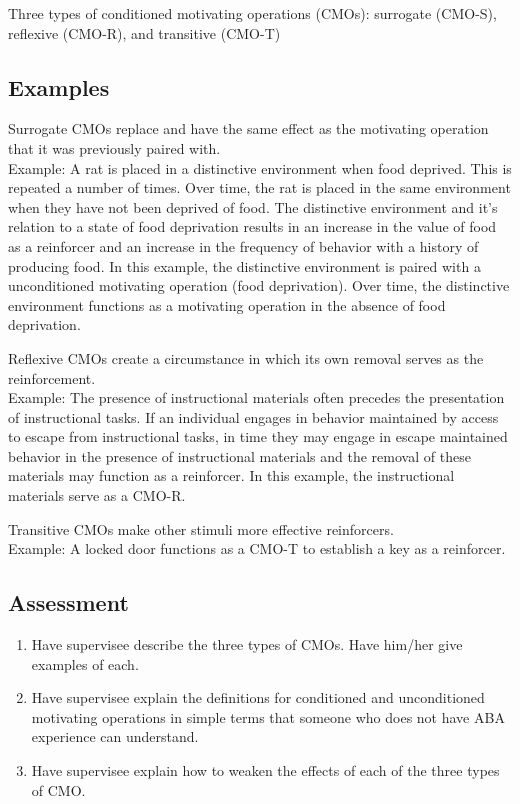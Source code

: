 Three types of conditioned motivating operations (CMOs): surrogate (CMO-S), reflexive (CMO-R), and transitive (CMO-T)\\



\subsection{Examples}
Surrogate CMOs replace and have the same effect as the motivating operation that it was previously paired with.\\

Example: A rat is placed in a distinctive environment when food deprived. This is repeated a number of times. Over time, the rat is placed in the same environment when they have not been deprived of food. The distinctive environment and it's relation to a state of food deprivation results in an increase in the value of food as a reinforcer and an increase in the frequency of behavior with a history of producing food. In this example, the distinctive environment is paired with a unconditioned motivating operation (food deprivation). Over time, the distinctive environment functions as a motivating operation in the absence of food deprivation. 

Reflexive CMOs create a circumstance in which its own removal serves as the reinforcement.\\

Example: The presence of instructional materials often precedes the presentation of instructional tasks. If an individual engages in behavior maintained by access to escape from instructional tasks, in time they may engage in escape maintained behavior in the presence of instructional materials and the removal of these materials may function as a reinforcer. In this example, the instructional materials serve as a CMO-R.

Transitive CMOs make other stimuli more effective reinforcers.\\

Example: A locked door functions as a CMO-T to establish a key as a reinforcer.
%
%
\subsection{Assessment}
\begin{enumerate}
\item Have supervisee describe the three types of CMOs. Have him/her give examples of each. 
\item Have supervisee explain the definitions for conditioned and unconditioned motivating operations in simple terms that someone who does not have ABA experience can understand.
\item Have supervisee explain how to weaken the effects of each of the three types of CMO. 
%
\end{enumerate}
%
